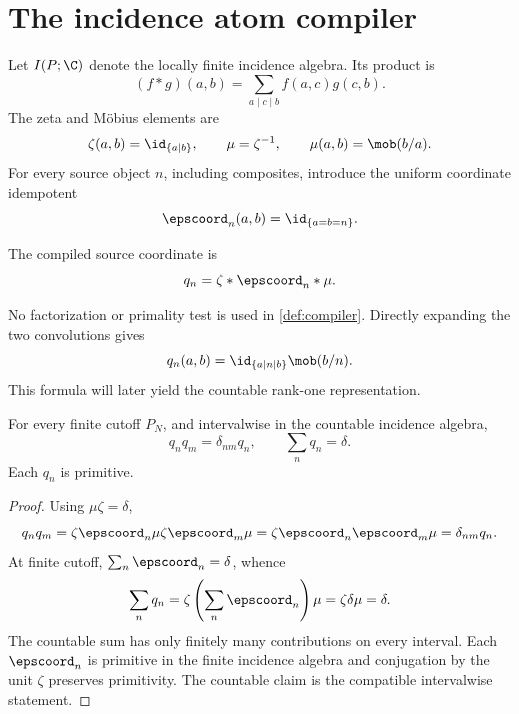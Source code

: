 \section{The incidence atom compiler}
\label{sec:compiler}

Let \(I(P;\C)\) denote the locally finite incidence algebra. Its product is
\begin{equation}
(f*g)(a,b)=\sum_{a\mid c\mid b}f(a,c)g(c,b).
\label{eq:incidence-product}
\end{equation}
The zeta and Möbius elements are
\begin{equation}
\zeta(a,b)=\id_{\{a\mid b\}},
\qquad
\mu=\zeta^{-1},
\qquad
\mu(a,b)=\mob(b/a).
\label{eq:zeta-mobius}
\end{equation}
For every source object \(n\), including composites, introduce the uniform
coordinate idempotent
\begin{equation}
\epscoord_n(a,b)=\id_{\{a=b=n\}}.
\label{eq:coordinate-idempotent}
\end{equation}

\begin{definition}
\label{def:compiler}
The compiled source coordinate is
\begin{equation}
q_n=\zeta*\epscoord_n*\mu.
\label{eq:compiler}
\end{equation}
\end{definition}

No factorization or primality test is used in \cref{def:compiler}. Directly
expanding the two convolutions gives
\begin{equation}
q_n(a,b)
=\id_{\{a\mid n\mid b\}}\mob(b/n).
\label{eq:kernel}
\end{equation}
This formula will later yield the countable rank-one representation.

\begin{theorem}
\label{thm:primitive-system}
For every finite cutoff \(P_N\), and intervalwise in the countable incidence
algebra,
\begin{equation}
q_nq_m=\delta_{nm}q_n,
\qquad
\sum_n q_n=\delta.
\label{eq:complete-idempotents}
\end{equation}
Each \(q_n\) is primitive.
\end{theorem}

\begin{proof}
Using \(\mu\zeta=\delta\),
\[
q_nq_m
=\zeta\epscoord_n\mu\zeta\epscoord_m\mu
=\zeta\epscoord_n\epscoord_m\mu
=\delta_{nm}q_n.
\]
At finite cutoff, \(\sum_n \epscoord_n=\delta\), whence
\[
\sum_n q_n
=\zeta\left(\sum_n \epscoord_n\right)\mu
=\zeta\delta\mu=\delta.
\]
The countable sum has only finitely many contributions on every interval.
Each \(\epscoord_n\) is primitive in the finite incidence algebra and
conjugation by the unit \(\zeta\) preserves primitivity. The countable claim
is the compatible intervalwise statement.
\end{proof}

